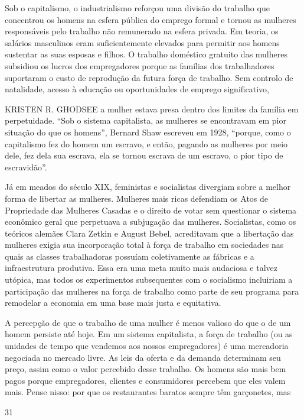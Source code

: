  \par 
Sob o capitalismo, o industrialismo reforçou uma divisão do trabalho que concentrou os homens na esfera pública do emprego formal e tornou as mulheres responsáveis ​​pelo trabalho não remunerado na esfera privada. Em teoria, os salários masculinos eram suficientemente elevados para permitir aos homens sustentar as suas esposas e filhos. O trabalho doméstico gratuito das mulheres subsidiou os lucros dos empregadores porque as famílias dos trabalhadores suportaram o custo de reprodução da futura força de trabalho. Sem controlo de natalidade, acesso à educação ou oportunidades de emprego significativo,
 \par 
KRISTEN R. GHODSEE a mulher estava presa dentro dos limites da família em perpetuidade. “Sob o sistema capitalista, as mulheres se encontravam em pior situação do que os homens”, Bernard Shaw escreveu em 1928, “porque, como o capitalismo fez do homem um escravo, e então, pagando as mulheres por meio dele, fez dela sua escrava, ela se tornou escrava de um escravo, o pior tipo de escravidão”.
 \par 
Já em meados do século XIX, feministas e socialistas divergiam sobre a melhor forma de libertar as mulheres. Mulheres mais ricas defendiam os Atos de Propriedade das Mulheres Casadas e o direito de votar sem questionar o sistema econômico geral que perpetuava a subjugação das mulheres. Socialistas, como os teóricos alemães Clara Zetkin e August Bebel, acreditavam que a libertação das mulheres exigia sua incorporação total à força de trabalho em sociedades nas quais as classes trabalhadoras possuíam coletivamente as fábricas e a infraestrutura produtiva. Essa era uma meta muito mais audaciosa e talvez utópica, mas todos os experimentos subsequentes com o socialismo incluiriam a participação das mulheres na força de trabalho como parte de seu programa para remodelar a economia em uma base mais justa e equitativa.
 \par 
A percepção de que o trabalho de uma mulher é menos valioso do que o de um homem persiste até hoje. Em um sistema capitalista, a força de trabalho (ou as unidades de tempo que vendemos aos nossos empregadores) é uma mercadoria negociada no mercado livre. As leis da oferta e da demanda determinam seu preço, assim como o valor percebido desse trabalho. Os homens são mais bem pagos porque empregadores, clientes e consumidores percebem que eles valem mais. Pense nisso: por que os restaurantes baratos sempre têm garçonetes, mas
 \par 
31
 \par 
